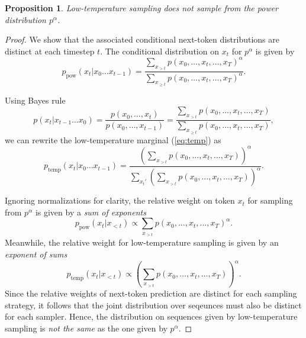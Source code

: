 \documentclass{article}
\newtheorem{proposition}{Proposition}
\begin{document}
\begin{proposition} Low-temperature sampling does not sample from the power distribution $p^{\alpha}$.
\end{proposition}
\begin{proof}
    We show that the associated conditional next-token distributions are distinct at each timestep $t$. The conditional distribution on $x_t$ for $p^{\alpha}$  is given by
\begin{equation}
    p_{\text{pow}}(x_t | x_0 \dots x_{t-1}) = \frac{\sum_{x_{>t}} p(x_0, \dots, x_t, \dots, x_T)^{\alpha}}{\sum_{x_{\geq t}} p(x_0, \dots, x_t, \dots, x_T)^{\alpha}}.
\end{equation}

Using Bayes rule
\begin{equation}
    p(x_t | x_{t-1} \dots x_0) = \frac{p(x_0, \dots, x_{t})}{p(x_0, \dots, x_{t-1})} = \frac{\sum_{x_{>t}} p(x_0, \dots, x_t, \dots, x_T)}{\sum_{x_{\geq t}} p(x_0, \dots, x_t, \dots, x_T)},
\end{equation}
we can rewrite the low-temperature marginal (\ref{eq:temp}) as 
\begin{equation}
    p_{\text{temp}}(x_t | x_0 \dots x_{t-1}) = \frac{\left(\sum_{x_{>t}} p(x_0, \dots, x_t, \dots, x_T)\right)^{\alpha}}{\sum_{x_t'}\left(\sum_{x_{>t}} p(x_0, \dots, x_t, \dots, x_T)\right)^{\alpha}}.
\end{equation}

Ignoring normalizations for clarity, the relative weight on token $x_t$ for sampling from $p^{\alpha}$ is given by a \textit{sum of exponents}
\begin{equation}\label{eq:sumexp}
    p_{\text{pow}}(x_t | x_{<t}) \propto \sum_{x_{>t}} p(x_0, \dots, x_t, \dots, x_T)^{\alpha}.
\end{equation}
Meanwhile, the relative weight for low-temperature sampling is given by an \textit{exponent of sums}
\begin{equation}\label{eq:expsum}
    p_{\text{temp}}(x_t | x_{<t}) \propto \left(\sum_{x_{>t}} p(x_0, \dots, x_t, \dots, x_T)\right)^{\alpha}.
\end{equation}
Since the relative weights of next-token prediction are distinct for each sampling strategy, it follows that the joint distribution over seqeunces must also be distinct for each sampler. Hence, the distribution on sequences given by low-temperature sampling is \textit{not the same} as the one given by $p^{\alpha}$.
\end{proof}
\end{document}
